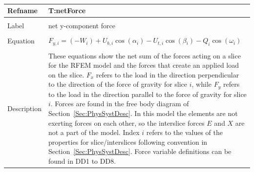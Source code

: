 \documentclass[12pt]{article}
\begin{document}
~\newline
\noindent \begin{minipage}{\textwidth}
\begin{tabular}{p{} p{}}
\toprule \textbf{Refname} & \textbf{T:netForce}
\label{T:netForce}
\\ \midrule \\
Label & net y-component force
\\ \midrule \\
Equation & $F_{y,i}=\left(-W_{i}\right)+U_{b,i}\cos\left(\alpha{}_{i}\right)-U_{t,i}\cos\left(\beta{}_{i}\right)-Q_{i}\cos\left(\omega{}_{i}\right)$
\\ \midrule \\
Description & These equations show the net sum of the forces acting on a slice for the RFEM model and the forces that create an applied load on the slice. $F_{x}$ refers to the load in the direction perpendicular to the direction of the force of gravity for slice $i$, while $F_{y}$ refers to the load in the direction parallel to the force of gravity for slice $i$. Forces are found in the free body diagram of Section~\ref{Sec:PhysSystDesc}. In this model the elements are not exerting forces on each other, so the interslice forces $E$ and $X$ are not a part of the model. Index $i$ refers to the values of the properties for slice/interslices following convention in Section~\ref{Sec:PhysSystDesc}. Force variable definitions can be found in DD1 to DD8.
\\ \bottomrule \end{tabular}
\end{minipage}\\
~\newline
\end{document}
